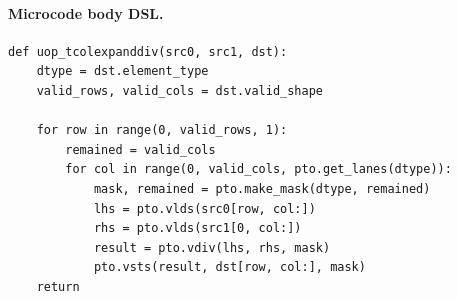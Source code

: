 \paragraph{Microcode body DSL.}
\begin{lstlisting}[style=ptocode]
def uop_tcolexpanddiv(src0, src1, dst):
    dtype = dst.element_type
    valid_rows, valid_cols = dst.valid_shape

    for row in range(0, valid_rows, 1):
        remained = valid_cols
        for col in range(0, valid_cols, pto.get_lanes(dtype)):
            mask, remained = pto.make_mask(dtype, remained)
            lhs = pto.vlds(src0[row, col:])
            rhs = pto.vlds(src1[0, col:])
            result = pto.vdiv(lhs, rhs, mask)
            pto.vsts(result, dst[row, col:], mask)
    return
\end{lstlisting}
\Needspace{0.34\textheight}
